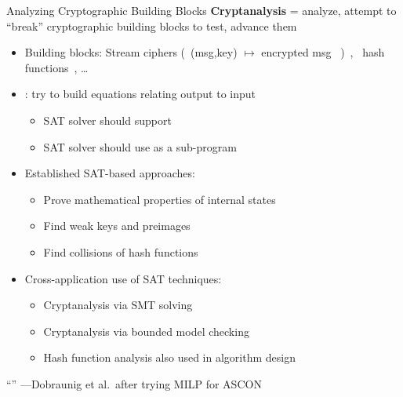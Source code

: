 \documentclass[t,english]{sdqbeamer}
\begin{document}
\begin{frame}{Analyzing Cryptographic Building Blocks}
	\textbf{Cryptanalysis} = analyze, attempt to ``break'' cryptographic building blocks to test, advance them
	\begin{itemize}\setlength{\itemsep}{1ex}
		\item Building blocks: Stream ciphers (\ (msg,key) $\mapsto$ encrypted msg \ )~\cite{soos09extending}, \ hash functions~\cite{dobraunig2015cryptanalysis}, \ldots
		\item {}: try to build equations relating output to input~\cite{soos09extending}
		\begin{itemize}
			\item SAT solver should support 
			\item SAT solver should use  as a sub-program
		\end{itemize}
		\pause
		\item Established SAT-based approaches:
		\begin{itemize}
			\item Prove mathematical properties of internal states~\cite{dobraunig2015cryptanalysis}
			\item Find weak keys and preimages~\cite{lafitte2014applications}
			\item Find collisions of hash functions~\cite{mironov2006applications}
		\end{itemize}
		\pause
		\item Cross-application use of SAT techniques:
		\begin{itemize}
			\item Cryptanalysis via SMT solving~\cite{xin2019improved}
			\item Cryptanalysis via bounded model checking~\cite{manthey2023testing}
			\item Hash function analysis also used in algorithm design~\cite{weaver2020constructing}
		\end{itemize}
	\end{itemize}
	
	\vspace*{2mm}
	``\textit{}'' ---Dobraunig et al.\ after trying MILP for ASCON~\cite{dobraunig2015cryptanalysis}
\end{frame}
\end{document}
